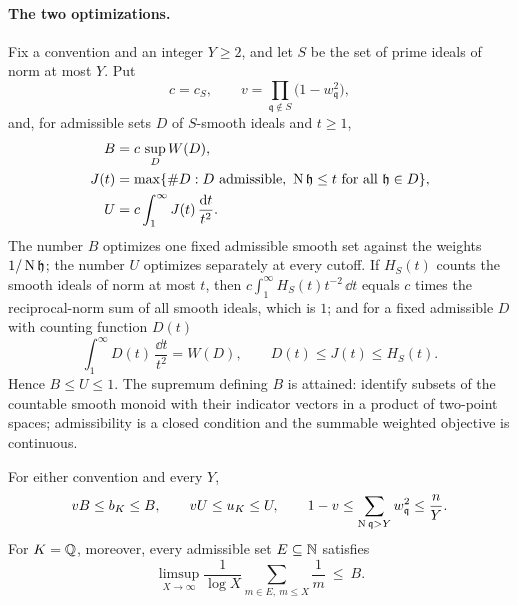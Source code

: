 \paragraph{The two optimizations.}
Fix a convention and an integer $Y\ge2$, and let $S$ be the set of prime ideals of norm at
most $Y$. Put
\[
 c=c_S,\qquad v=\prod_{\mathfrak q\notin S}\bigl(1-w_{\mathfrak q}^{2}\bigr),
\]
and, for admissible sets $D$ of $S$-smooth ideals and $t\ge1$,
\begin{align*}
 B&=c\,\sup_{D}W(D),\\
 J(t)&=\max\{\#D:D\text{ admissible},\ \operatorname{N}\mathfrak h\le t\text{ for all }\mathfrak h\in D\},\\
 U&=c\int_1^\infty J(t)\,\frac{\mathrm{d} t}{t^2}.
\end{align*}
The number $B$ optimizes one fixed admissible smooth set against the weights
$1/\operatorname{N}\mathfrak h$; the number $U$ optimizes separately at every cutoff. If $H_S(t)$ counts the
smooth ideals of norm at most $t$, then $c\int_1^\infty H_S(t)t^{-2}\,\dd t$ equals $c$ times
the reciprocal-norm sum of all smooth ideals, which is $1$; and for a fixed admissible $D$
with counting function $D(t)$
\begin{equation}\label{gpi:eq:tonelli}
 \int_1^\infty D(t)\,\frac{\dd t}{t^2}=W(D),\qquad D(t)\le J(t)\le H_S(t).
\end{equation}
Hence $B\le U\le1$. The supremum defining $B$ is attained: identify subsets of the countable
smooth monoid with their indicator vectors in a product of two-point spaces; admissibility is
a closed condition and the summable weighted objective is continuous.

\begin{lemma}\label{gpi:lem:BU}
For either convention and every $Y$,
\[
 vB\le b_K\le B,\qquad vU\le u_K\le U,\qquad
 1-v\le\sum_{\operatorname{N}\mathfrak q>Y}w_{\mathfrak q}^2\le\frac nY .
\]
For $K=\mathbb{Q}$, moreover, every admissible set $E\subseteq\mathbb{N}$ satisfies
\[
 \limsup_{X\to\infty}\frac1{\log X}\sum_{m\in E,\ m\le X}\frac1m\ \le\ B .
\]
\end{lemma}

